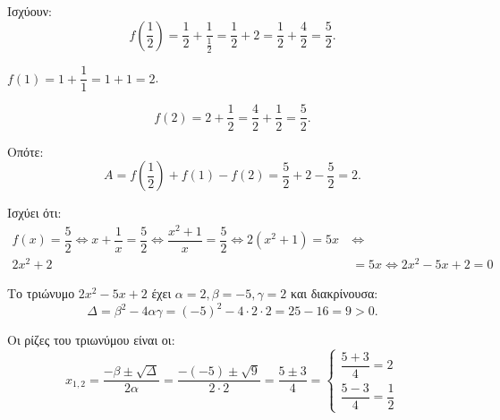 
\begin{alist}
\item Ισχύουν:
\[f\left(\dfrac{1}{2}\right) = \dfrac{1}{2} + \dfrac{1}{\frac{1}{2}} = \dfrac{1}{2} + 2 = \dfrac{1}{2} + \dfrac{4}{2} = \dfrac{5}{2}.\]

$f(1) = 1 + \dfrac{1}{1} = 1 + 1 = 2$.

\[f(2) = 2 + \dfrac{1}{2} = \dfrac{4}{2} + \dfrac{1}{2} = \dfrac{5}{2}.\]

Οπότε:
\[A = f\left(\dfrac{1}{2}\right) + f(1) - f(2) = \dfrac{5}{2} + 2 - \dfrac{5}{2} = 2.\]

\item Ισχύει ότι:
\begin{align*}
f(x) = \dfrac{5}{2} \Leftrightarrow x + \dfrac{1}{x} = \dfrac{5}{2} \Leftrightarrow \dfrac{x^2 + 1}{x} = \dfrac{5}{2} \Leftrightarrow 2(x^2 + 1) = 5x \ &\Leftrightarrow \\
2x^2 + 2 &= 5x \Leftrightarrow 2x^2 - 5x + 2 = 0
\end{align*}

Το τριώνυμο $2x^2 - 5x + 2$ έχει $\alpha = 2, \beta = -5, \gamma = 2$ και διακρίνουσα:
\[\Delta = \beta^2 - 4\alpha\gamma = (-5)^2 - 4 \cdot 2 \cdot 2 = 25 - 16 = 9 > 0.\]

Οι ρίζες του τριωνύμου είναι οι:
\[x_{1,2} = \dfrac{-\beta \pm \sqrt{\Delta}}{2\alpha} = \dfrac{-(-5) \pm \sqrt{9}}{2 \cdot 2} = \dfrac{5 \pm 3}{4} = \begin{cases} \dfrac{5 + 3}{4} = 2 \\[2ex] \dfrac{5 - 3}{4} = \dfrac{1}{2} \end{cases}\]
\end{alist}

